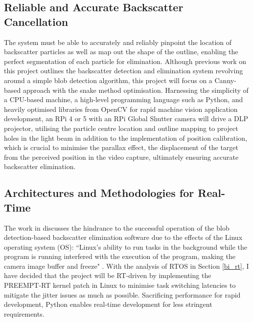 \subsection{Reliable and Accurate Backscatter Cancellation}
The system must be able to accurately and reliably pinpoint the location of backscatter particles as well as map out the shape of the outline, enabling the perfect segmentation of each particle for elimination. Although previous work on this project \cite{katieshepherdMachineVisionBased2023} outlines the backscatter detection and elimination system revolving around a simple blob detection algorithm, this project will focus on a Canny-based approach with the snake method optimisation. Harnessing the simplicity of a CPU-based machine, a high-level programming language such as Python, and heavily optimised libraries from OpenCV for rapid machine vision application development, an RPi 4 or 5 with an RPi Global Shutter camera will drive a DLP projector, utilising the particle centre location and outline mapping to project holes in the light beam in addition to the implementation of position calibration, which is crucial to minimise the parallax effect, the displacement of the target from the perceived position in the video capture, ultimately ensuring accurate backscatter elimination.

\subsection{Architectures and Methodologies for Real-Time}
The work in \cite{katieshepherdMachineVisionBased2023} discusses the hindrance to the successful operation of the blob detection-based backscatter elimination software due to the effects of the Linux operating system (OS): ``Linux's ability to run tasks in the background while the program is running interfered with the execution of the program, making the camera image buffer and freeze" \cite{katieshepherdMachineVisionBased2023}. With the analysis of RTOS in Section \ref{bi_rt}, I have decided that the project will be RT-driven by implementing the PREEMPT-RT kernel patch in Linux to minimise task switching latencies to mitigate the jitter issues as much as possible. Sacrificing performance for rapid development, Python enables real-time development for less stringent requirements.

